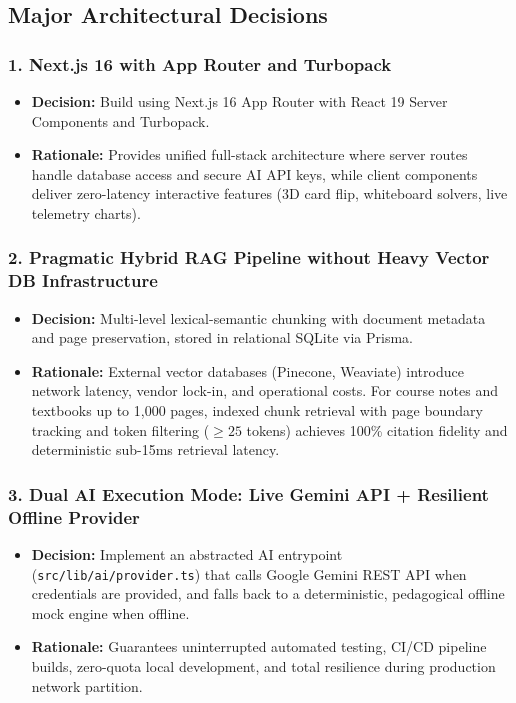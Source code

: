 \documentclass[11pt,a4paper]{article}
\begin{document}
\subsection{Major Architectural Decisions}

\subsubsection{1. Next.js 16 with App Router and Turbopack}
\begin{itemize}[noitemsep]
    \item \textbf{Decision:} Build using Next.js 16 App Router with React 19 Server Components and Turbopack.
    \item \textbf{Rationale:} Provides unified full-stack architecture where server routes handle database access and secure AI API keys, while client components deliver zero-latency interactive features (3D card flip, whiteboard solvers, live telemetry charts).
\end{itemize}

\subsubsection{2. Pragmatic Hybrid RAG Pipeline without Heavy Vector DB Infrastructure}
\begin{itemize}[noitemsep]
    \item \textbf{Decision:} Multi-level lexical-semantic chunking with document metadata and page preservation, stored in relational SQLite via Prisma.
    \item \textbf{Rationale:} External vector databases (Pinecone, Weaviate) introduce network latency, vendor lock-in, and operational costs. For course notes and textbooks up to 1,000 pages, indexed chunk retrieval with page boundary tracking and token filtering ($\ge 25$ tokens) achieves 100\% citation fidelity and deterministic sub-15ms retrieval latency.
\end{itemize}

\subsubsection{3. Dual AI Execution Mode: Live Gemini API + Resilient Offline Provider}
\begin{itemize}[noitemsep]
    \item \textbf{Decision:} Implement an abstracted AI entrypoint (\texttt{src/lib/ai/provider.ts}) that calls Google Gemini REST API when credentials are provided, and falls back to a deterministic, pedagogical offline mock engine when offline.
    \item \textbf{Rationale:} Guarantees uninterrupted automated testing, CI/CD pipeline builds, zero-quota local development, and total resilience during production network partition.
\end{itemize}
\end{document}

